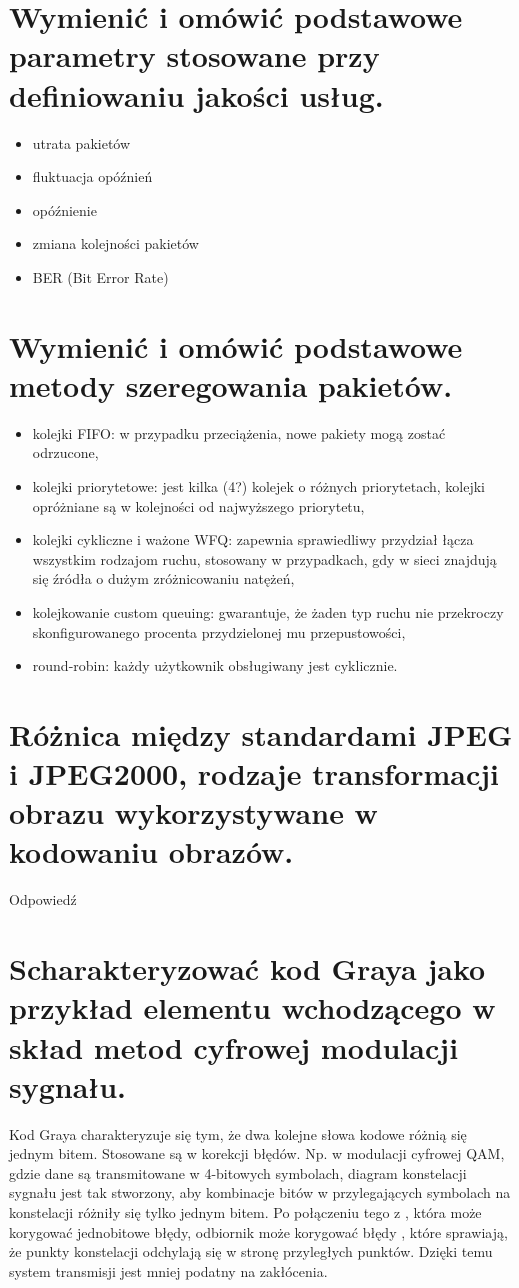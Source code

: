 \documentclass[12pt,a4paper]{article}
\begin{document}
	\section{Wymienić i omówić podstawowe parametry stosowane przy definiowaniu jakości usług.}
	\begin{itemize}
		\item utrata pakietów
		\item fluktuacja opóźnień
		\item opóźnienie
		\item zmiana kolejności pakietów
		\item BER (Bit Error Rate)
	\end{itemize}

	\section{Wymienić i omówić podstawowe metody szeregowania pakietów.}
	\begin{itemize}
		\item kolejki FIFO: w przypadku przeciążenia, nowe pakiety mogą zostać odrzucone,
		\item kolejki priorytetowe: jest kilka (4?) kolejek o różnych priorytetach, kolejki opróżniane są w kolejności od najwyższego priorytetu,
		\item kolejki cykliczne i ważone WFQ: zapewnia sprawiedliwy przydział łącza wszystkim rodzajom ruchu, stosowany w przypadkach, gdy w sieci znajdują się źródła o dużym zróżnicowaniu natężeń,
		\item kolejkowanie custom queuing: gwarantuje, że żaden typ ruchu nie przekroczy skonfigurowanego procenta przydzielonej mu przepustowości,
		\item round-robin: każdy użytkownik obsługiwany jest cyklicznie.
	\end{itemize}

	\section{Różnica między standardami JPEG i JPEG2000, rodzaje transformacji obrazu wykorzystywane w kodowaniu obrazów.}
	Odpowiedź

	\section{Scharakteryzować kod Graya jako przykład elementu wchodzącego w skład metod cyfrowej modulacji sygnału.}
	Kod Graya charakteryzuje się tym, że dwa kolejne słowa kodowe różnią się jednym bitem. Stosowane są w korekcji błędów. Np. w modulacji cyfrowej QAM, gdzie dane są transmitowane w 4-bitowych symbolach, diagram konstelacji sygnału jest tak stworzony, aby kombinacje bitów w przylegających symbolach na konstelacji różniły się tylko jednym bitem. Po połączeniu tego z , która może korygować jednobitowe błędy, odbiornik może korygować błędy , które sprawiają, że punkty konstelacji odchylają się w stronę przyległych punktów. Dzięki temu system transmisji jest mniej podatny na zakłócenia.
\end{document}
